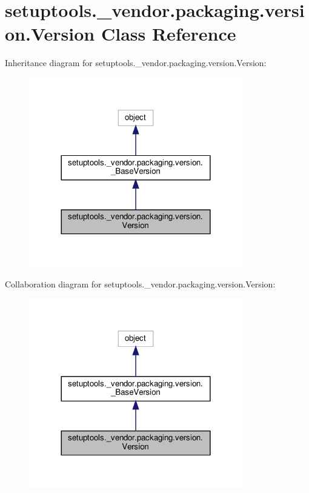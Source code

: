 \hypertarget{classsetuptools_1_1__vendor_1_1packaging_1_1version_1_1Version}{}\section{setuptools.\+\_\+vendor.\+packaging.\+version.\+Version Class Reference}
\label{classsetuptools_1_1__vendor_1_1packaging_1_1version_1_1Version}


Inheritance diagram for setuptools.\+\_\+vendor.\+packaging.\+version.\+Version\+:
\nopagebreak
\begin{figure}[H]
\begin{center}
\leavevmode
\includegraphics[width=264pt]{classsetuptools_1_1__vendor_1_1packaging_1_1version_1_1Version__inherit__graph}
\end{center}
\end{figure}


Collaboration diagram for setuptools.\+\_\+vendor.\+packaging.\+version.\+Version\+:
\nopagebreak
\begin{figure}[H]
\begin{center}
\leavevmode
\includegraphics[width=264pt]{classsetuptools_1_1__vendor_1_1packaging_1_1version_1_1Version__coll__graph}
\end{center}
\end{figure}
